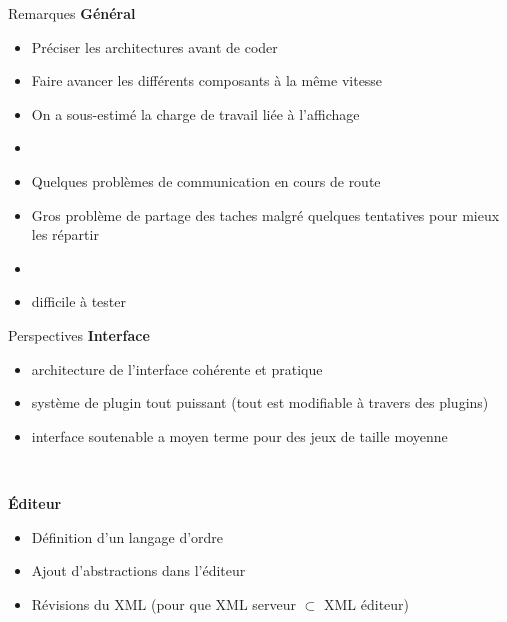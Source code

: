 \documentclass[11pt]{beamer}
\begin{document}
\begin{frame}{Remarques}
	\textbf{Général}
	\begin{itemize}
		\item Préciser les architectures avant de coder
		\item Faire avancer les différents composants à la même vitesse
		\item On a sous-estimé la charge de travail liée à l'affichage
		\item[]
		\item Quelques problèmes de communication en cours de route
		\item Gros problème de partage des taches malgré quelques tentatives pour mieux les répartir
		\item[]
		\item difficile à tester
	\end{itemize}
\end{frame}


\begin{frame}{Perspectives}
	\textbf{Interface}
	\begin{itemize}
		\item architecture de l'interface cohérente et pratique
		\item système de plugin tout puissant (tout est modifiable à travers des plugins)
		\item interface soutenable a moyen terme pour des jeux de taille moyenne
	\end{itemize}
	
	~
	
	\textbf{Éditeur}
	\begin{itemize}
		\item Définition d'un langage d'ordre
		\item Ajout d'abstractions dans l'éditeur
		\item Révisions du XML (pour que XML serveur $\subset$ XML éditeur)
	\end{itemize}
\end{frame}
\end{document}
